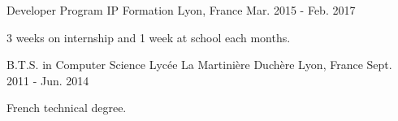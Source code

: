 

\begin{cventries}

  \cventry
  {Developer Program}%
  {IP Formation} %
  {Lyon, France} %
  {Mar. 2015 - Feb. 2017} %
    {
      \begin{cvitems} %
      \item {3 weeks on internship and 1 week at school each months.}
      \end{cvitems}
    }
  \cventry
  {B.T.S. in Computer Science} %
  {Lycée La Martinière Duchère} %
  {Lyon, France} %
  {Sept. 2011 - Jun. 2014} %
  {
    \begin{cvitems} %
    \item {French technical degree.}
    \end{cvitems}
  }
\end{cventries}
